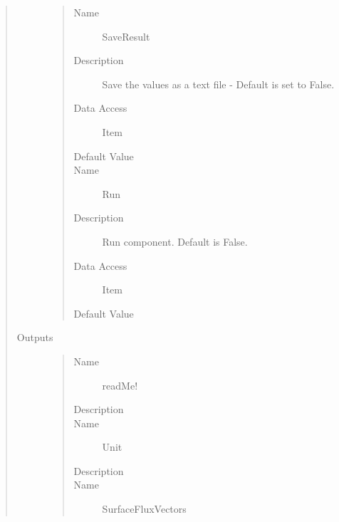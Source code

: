 \documentclass[letterpaper,10pt,english]{sphinxmanual}
\begin{document}
\begin{quote}
\begin{description}
\begin{quote}
\begin{description}
\item[{Name}] \leavevmode
SaveResult

\item[{Description}] \leavevmode
Save the values as a text file - Default is set to False.

\item[{Data Access}] \leavevmode
Item

\item[{Default Value}] \leavevmode
{}

\item[{Name}] \leavevmode
Run

\item[{Description}] \leavevmode
Run component. Default is False.

\item[{Data Access}] \leavevmode
Item

\item[{Default Value}] \leavevmode
{}

\end{description}\end{quote}

\item[{Outputs}] \leavevmode\begin{quote}\begin{description}
\item[{Name}] \leavevmode
readMe!

\item[{Description}] \leavevmode
{}

\item[{Name}] \leavevmode
Unit

\item[{Description}] \leavevmode
{}

\item[{Name}] \leavevmode
SurfaceFluxVectors


\end{description}
\end{quote}
\end{description}
\end{quote}
\end{document}
